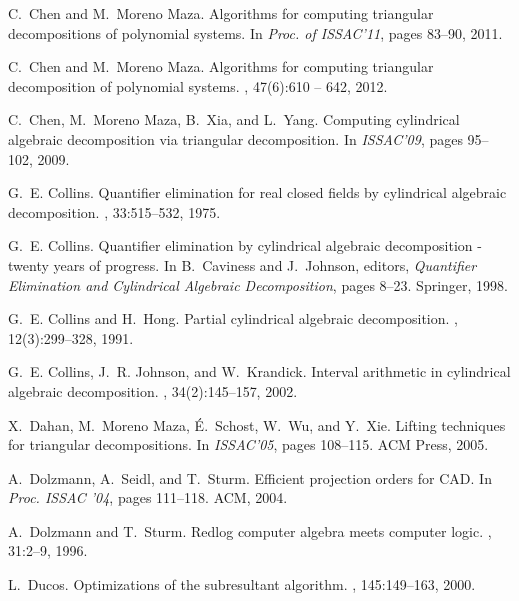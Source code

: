 \documentclass[10pt]{article}
\begin{document}
\begin{thebibliography}{10}
C.~Chen and M.~{Moreno Maza}.
\newblock Algorithms for computing triangular decompositions of polynomial
  systems.
\newblock In {\em Proc. of ISSAC'11}, pages 83--90, 2011.

C.~Chen and M.~{Moreno Maza}.
\newblock Algorithms for computing triangular decomposition of polynomial
  systems.
, 47(6):610 -- 642, 2012.

C.~Chen, M.~{Moreno Maza}, B.~{Xia}, and L.~Yang.
\newblock Computing cylindrical algebraic decomposition via triangular
  decomposition.
\newblock In {\em ISSAC'09}, pages 95--102, 2009.

G.~E. Collins.
\newblock Quantifier elimination for real closed fields by cylindrical
  algebraic decomposition.
, 33:515--532, 1975.

G.~E. Collins.
\newblock Quantifier elimination by cylindrical algebraic decomposition -
  twenty years of progress.
\newblock In B.~Caviness and J.~Johnson, editors, {\em Quantifier Elimination
  and Cylindrical Algebraic Decomposition}, pages 8--23. Springer, 1998.

G.~E. Collins and H.~Hong.
\newblock Partial cylindrical algebraic decomposition.
, 12(3):299--328, 1991.

G.~E. Collins, J.~R. Johnson, and W.~Krandick.
\newblock Interval arithmetic in cylindrical algebraic decomposition.
, 34(2):145--157, 2002.

X.~{Dahan}, M.~{{Moreno Maza}}, {\'E}.~{Schost}, W.~{Wu}, and Y.~{Xie}.
\newblock Lifting techniques for triangular decompositions.
\newblock In {\em ISSAC'05}, pages 108--115. ACM Press, 2005.

A.~Dolzmann, A.~Seidl, and T.~Sturm.
\newblock Efficient projection orders for {CAD}.
\newblock In {\em Proc. ISSAC '04}, pages 111--118. ACM, 2004.

A.~Dolzmann and T.~Sturm.
\newblock Redlog computer algebra meets computer logic.
, 31:2--9, 1996.

L.~Ducos.
\newblock Optimizations of the subresultant algorithm.
, 145:149--163, 2000.


\end{thebibliography}
\end{document}
